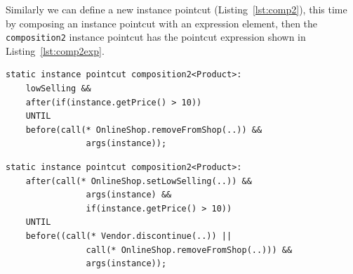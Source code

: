 \documentclass{acm_proc_article-sp}
\begin{document}
Similarly we can define a new instance pointcut (Listing~\ref{lst:comp2}), this time by composing an instance pointcut with an expression element, then the \lstinline{composition2} instance pointcut has the pointcut expression shown in Listing~\ref{lst:comp2exp}.

\begin{lstlisting}[float=h!, caption={An instance pointcut and an expression is composed}, label={lst:comp2}]
static instance pointcut composition2<Product>: 
	lowSelling && 
	after(if(instance.getPrice() > 10)) 
	UNTIL 
	before(call(* OnlineShop.removeFromShop(..)) && 
				args(instance));
\end{lstlisting}


\begin{lstlisting}[float=h!, caption={The composition2 instance pointcut after composition}, label={lst:comp2exp}]
static instance pointcut composition2<Product>: 
	after(call(* OnlineShop.setLowSelling(..)) && 
				args(instance) && 
				if(instance.getPrice() > 10)) 
	UNTIL
	before((call(* Vendor.discontinue(..)) || 
				call(* OnlineShop.removeFromShop(..))) && 
				args(instance));
\end{lstlisting}
\end{document}
